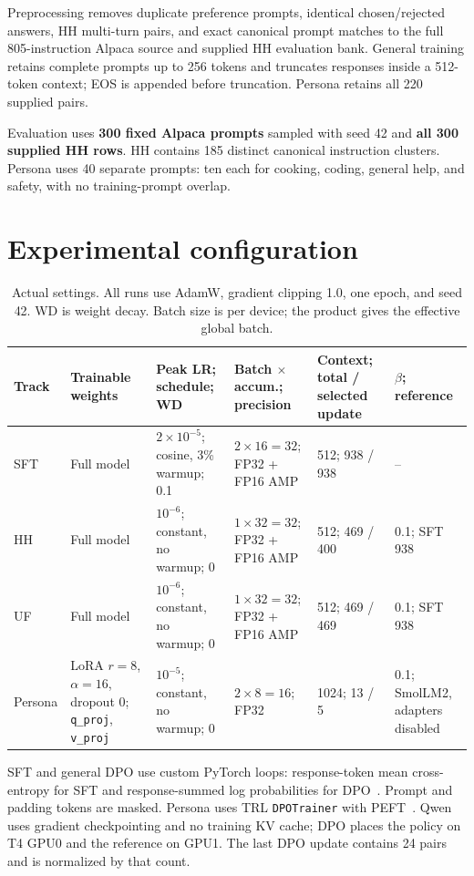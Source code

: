 \documentclass[11pt,a4paper]{article}
\begin{document}
Preprocessing removes duplicate preference prompts, identical chosen/rejected answers, HH multi-turn pairs, and exact canonical prompt matches to the full 805-instruction Alpaca source and supplied HH evaluation bank. General training retains complete prompts up to 256 tokens and truncates responses inside a 512-token context; EOS is appended before truncation. Persona retains all 220 supplied pairs.

Evaluation uses \textbf{300 fixed Alpaca prompts} sampled with seed 42 and \textbf{all 300 supplied HH rows}. HH contains 185 distinct canonical instruction clusters. Persona uses 40 separate prompts: ten each for cooking, coding, general help, and safety, with no training-prompt overlap.

\section{Experimental configuration}
\begin{table}[H]
\centering\fontsize{9}{11}\selectfont
\begin{tabularx}{\linewidth}{@{}lYYYYY@{}}\toprule
Track & Trainable weights & Peak LR; schedule; WD & Batch $\times$ accum.; precision & Context; total / selected update & $\beta$; reference\\\midrule
SFT & Full model & $2\!\times\!10^{-5}$; cosine, 3\% warmup; 0.1 & $2\times16=32$; FP32 + FP16 AMP & 512; 938 / 938 & --\\
HH & Full model & $10^{-6}$; constant, no warmup; 0 & $1\times32=32$; FP32 + FP16 AMP & 512; 469 / 400 & 0.1; SFT 938\\
UF & Full model & $10^{-6}$; constant, no warmup; 0 & $1\times32=32$; FP32 + FP16 AMP & 512; 469 / 469 & 0.1; SFT 938\\
Persona & LoRA $r=8$, $\alpha=16$, dropout 0; \texttt{q\_proj}, \texttt{v\_proj} & $10^{-5}$; constant, no warmup; 0 & $2\times8=16$; FP32 & 1024; 13 / 5 & 0.1; SmolLM2, adapters disabled\\\bottomrule
\end{tabularx}
\caption{Actual settings. All runs use AdamW, gradient clipping 1.0, one epoch, and seed 42. WD is weight decay. Batch size is per device; the product gives the effective global batch.}
\end{table}

SFT and general DPO use custom PyTorch loops: response-token mean cross-entropy for SFT and response-summed log probabilities for DPO~\cite{dpo}. Prompt and padding tokens are masked. Persona uses TRL \texttt{DPOTrainer} with PEFT~\cite{trl,peft}. Qwen uses gradient checkpointing and no training KV cache; DPO places the policy on T4 GPU0 and the reference on GPU1. The last DPO update contains 24 pairs and is normalized by that count.
\end{document}
